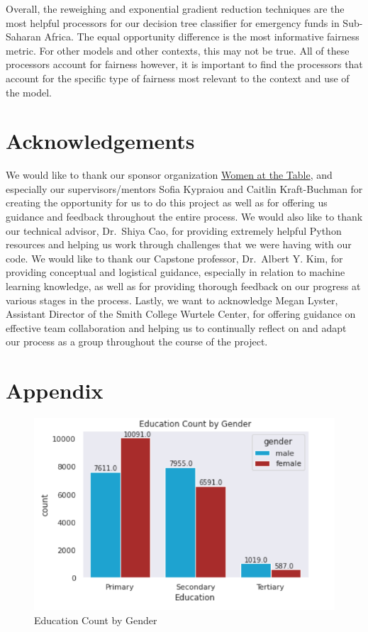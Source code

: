 \documentclass[water,article,submit,moreauthors,pdftex]{mdpi}
\begin{document}
Overall, the reweighing and exponential gradient reduction techniques
are the most helpful processors for our decision tree classifier for
emergency funds in Sub-Saharan Africa. The equal opportunity difference
is the most informative fairness metric. For other models and other
contexts, this may not be true. All of these processors account for
fairness however, it is important to find the processors that account
for the specific type of fairness most relevant to the context and use
of the model.

\hypertarget{acknowledgements}{%
\section{Acknowledgements}\label{acknowledgements}}

We would like to thank our sponsor organization
\href{https://www.womenatthetable.net/}{Women at the Table}, and
especially our supervisors/mentors Sofia Kypraiou and Caitlin
Kraft-Buchman for creating the opportunity for us to do this project as
well as for offering us guidance and feedback throughout the entire
process. We would also like to thank our technical advisor, Dr.~Shiya
Cao, for providing extremely helpful Python resources and helping us
work through challenges that we were having with our code. We would like
to thank our Capstone professor, Dr.~Albert Y. Kim, for providing
conceptual and logistical guidance, especially in relation to machine
learning knowledge, as well as for providing thorough feedback on our
progress at various stages in the process. Lastly, we want to
acknowledge Megan Lyster, Assistant Director of the Smith College
Wurtele Center, for offering guidance on effective team collaboration
and helping us to continually reflect on and adapt our process as a
group throughout the course of the project.

\hypertarget{appendix}{%
\section{Appendix}\label{appendix}}

\begin{figure}
\centering
\includegraphics[width=\textwidth,height=0.5\textheight]{images/educ_count_gender.png}
\caption{Education Count by Gender}
\end{figure}
\end{document}
